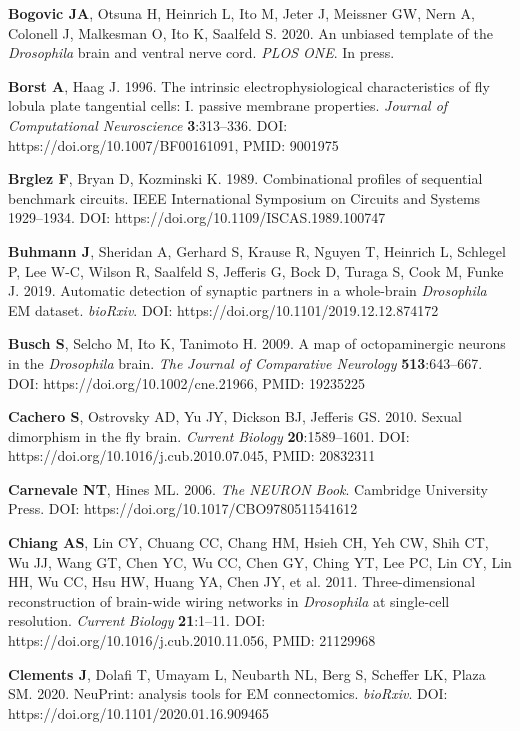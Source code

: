 \documentclass{article}
\begin{document}
\begin{hangpars}
\textbf{Bogovic JA}, Otsuna H, Heinrich L, Ito M, Jeter J, Meissner GW, Nern A, Colonell J, Malkesman O, Ito K, Saalfeld S. 2020. An unbiased template of the \emph{Drosophila} brain and ventral nerve cord. \emph{PLOS ONE}. In press.

\textbf{Borst A}, Haag J. 1996. The intrinsic electrophysiological characteristics of fly lobula plate tangential cells: I. passive membrane properties. \emph{Journal of Computational Neuroscience} \textbf{3}:313–336. DOI: https://doi.org/10.1007/BF00161091, PMID: 9001975

\textbf{Brglez F}, Bryan D, Kozminski K. 1989. Combinational profiles of sequential benchmark circuits. IEEE International Symposium on Circuits and Systems 1929–1934. DOI: https://doi.org/10.1109/ISCAS.1989.100747

\textbf{Buhmann J}, Sheridan A, Gerhard S, Krause R, Nguyen T, Heinrich L, Schlegel P, Lee W-C, Wilson R, Saalfeld S, Jefferis G, Bock D, Turaga S, Cook M, Funke J. 2019. Automatic detection of synaptic partners in a whole-brain \emph{Drosophila} EM dataset. \emph{bioRxiv}. DOI: https://doi.org/10.1101/2019.12.12.874172

\textbf{Busch S}, Selcho M, Ito K, Tanimoto H. 2009. A map of octopaminergic neurons in the \emph{Drosophila} brain. \emph{The} \emph{Journal of Comparative Neurology} \textbf{513}:643–667. DOI: https://doi.org/10.1002/cne.21966, PMID: 19235225

\textbf{Cachero S}, Ostrovsky AD, Yu JY, Dickson BJ, Jefferis GS. 2010. Sexual dimorphism in the fly brain. \emph{Current} \emph{Biology} \textbf{20}:1589–1601. DOI: https://doi.org/10.1016/j.cub.2010.07.045, PMID: 20832311

\textbf{Carnevale NT}, Hines ML. 2006. \emph{The NEURON Book}. Cambridge University Press. DOI: https://doi.org/10.1017/CBO9780511541612

\textbf{Chiang AS}, Lin CY, Chuang CC, Chang HM, Hsieh CH, Yeh CW, Shih CT, Wu JJ, Wang GT, Chen YC, Wu CC, Chen GY, Ching YT, Lee PC, Lin CY, Lin HH, Wu CC, Hsu HW, Huang YA, Chen JY, et al. 2011. Three-dimensional reconstruction of brain-wide wiring networks in \emph{Drosophila} at single-cell resolution. \emph{Current} \emph{Biology} \textbf{21}:1–11. DOI: https://doi.org/10.1016/j.cub.2010.11.056, PMID: 21129968

\textbf{Clements J}, Dolafi T, Umayam L, Neubarth NL, Berg S, Scheffer LK, Plaza SM. 2020. NeuPrint: analysis tools for EM connectomics. \emph{bioRxiv}. DOI: https://doi.org/10.1101/2020.01.16.909465


\end{hangpars}
\end{document}
